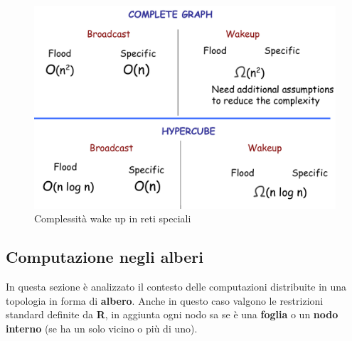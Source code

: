 \documentclass[12pt]{article}
\begin{document}
	  		\begin{figure}[h!]
	  			\centering
	  			\includegraphics[scale=0.3]{img/wak.png}
	  			\caption{Complessità wake up in reti speciali}
	  		\end{figure}
			
			
\subsection{Computazione negli alberi}		
	In questa sezione è analizzato il contesto delle computazioni distribuite in una topologia in forma di \textbf{albero}. Anche in questo caso valgono le restrizioni standard definite da \textbf{R}, in aggiunta ogni nodo sa se è una \textbf{foglia} o un \textbf{nodo interno} (se ha un solo vicino o più di uno).
	
\end{document}
